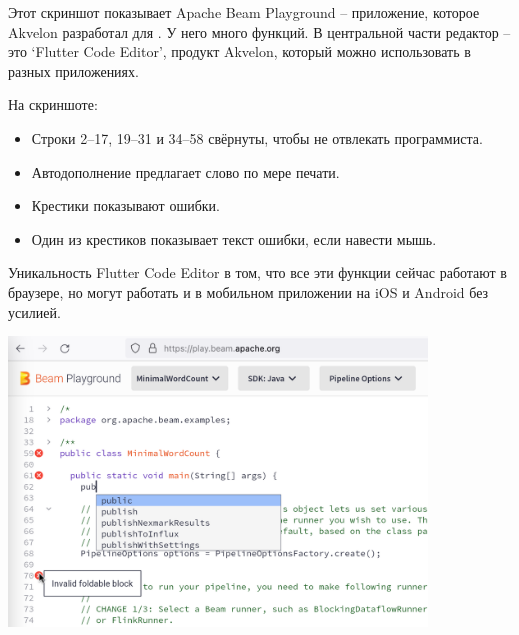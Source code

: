 
Этот скриншот показывает Apache Beam Playground -- приложение, которое Akvelon разработал
для \Asf.
У него много функций.
В центральной части редактор -- это `Flutter Code Editor',
продукт Akvelon, который можно использовать в разных приложениях.

На скриншоте:

\begin{itemize}
    \item Строки 2--17, 19--31 и 34--58 свёрнуты, чтобы не отвлекать программиста.
    \item Автодополнение предлагает слово по мере печати.
    \item Крестики показывают ошибки.
    \item Один из крестиков показывает текст ошибки, если навести мышь.
\end{itemize}

Уникальность Flutter Code Editor в том, что все эти функции сейчас работают в браузере,
но могут работать и в мобильном приложении на iOS и Android без усилией.

\begin{center}
    \includegraphics[width=30em]{demo}
\end{center}

\pagebreak
